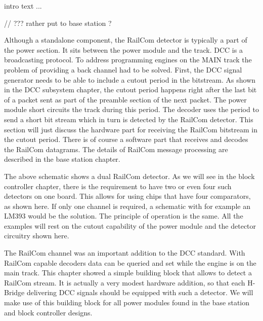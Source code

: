 
intro text ...

// ??? rather put to base station ?



Although a standalone component, the RailCom detector is typically a part of the power section. It sits between the power module and the track. DCC is a broadcasting protocol. To address programming engines on the MAIN track the problem of providing a back channel had to be solved. First, the DCC signal generator needs to be able to include a cutout period in the bitstream. As shown in the DCC subsystem chapter, the cutout period happens right after the last bit of a packet sent as part of the preamble section of the next packet. The power module short circuits the track during this period. The decoder uses the period to send a short bit stream which in turn is detected by the RailCom detector. This section will just discuss the hardware part for receiving the RailCom bitstream in the cutout period. There is of course a software part that receives and decodes the RailCom datagrams. The details of RailCom message processing are described in the base station chapter.


The above schematic shows a dual RailCom detector. As we will see in the block controller chapter, there is the requirement to have two or even four such detectors on one board. This allows for using chips that have four comparators, as shown here. If only one channel is required, a schematic with for example an LM393 would be the solution. The principle of operation is the same. All the examples will rest on the cutout capability of the power module and the detector circuitry shown here.




The RailCom channel was an important addition to the DCC standard. With RailCom capable decoders data can be queried and set while the engine is on the main track. This chapter showed a simple building block that allows to detect a RailCom stream. It is actually a very modest hardware addition, so that each H-Bridge delivering DCC signals should be equipped with such a detector. We will make use of this building block for all power modules found in the base station and block controller designs.

